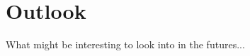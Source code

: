 \documentclass[journal, a4paper]{}
\begin{document}
\section{Outlook}
What might be interesting to look into in the futures...
\end{document}
